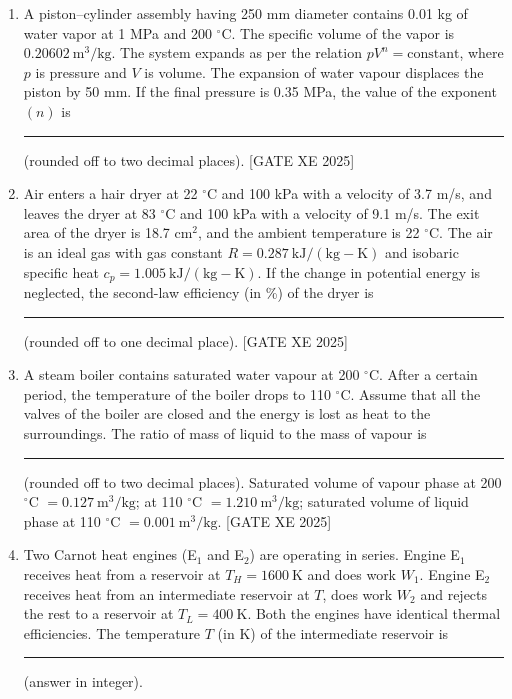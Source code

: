 \documentclass[journal,12pt,onecolumn]{IEEEtran}
\theoremstyle{remark}
\begin{document}
\begin{enumerate}
\item A piston–cylinder assembly having 250 mm diameter contains 0.01 kg of water vapor at 1 MPa and 200 $^\circ$C. The specific volume of the vapor is $0.20602\ \mathrm{m^3/kg}$. The system expands as per the relation $pV^n=\text{constant}$, where $p$ is pressure and $V$ is volume. The expansion of water vapour displaces the piston by 50 mm. If the final pressure is 0.35 MPa, the value of the exponent $(n)$ is \rule{3cm}{0.15mm} (rounded off to two decimal places).
\hfill[GATE XE 2025]

\item Air enters a hair dryer at 22 $^\circ$C and 100 kPa with a velocity of 3.7 m/s, and leaves the dryer at 83 $^\circ$C and 100 kPa with a velocity of 9.1 m/s. The exit area of the dryer is 18.7 cm$^2$, and the ambient temperature is 22 $^\circ$C. The air is an ideal gas with gas constant $R=0.287\ \mathrm{kJ/(kg\!-\!K)}$ and isobaric specific heat $c_p=1.005\ \mathrm{kJ/(kg\!-\!K)}$. If the change in potential energy is neglected, the second-law efficiency (in \%) of the dryer is \rule{3cm}{0.15mm} (rounded off to one decimal place).
\hfill[GATE XE 2025]

\item A steam boiler contains saturated water vapour at 200 $^\circ$C. After a certain period, the temperature of the boiler drops to 110 $^\circ$C. Assume that all the valves of the boiler are closed and the energy is lost as heat to the surroundings. The ratio of mass of liquid to the mass of vapour is \rule{3cm}{0.15mm} (rounded off to two decimal places). Saturated volume of vapour phase at 200 $^\circ$C $=0.127\ \mathrm{m^3/kg}$; at 110 $^\circ$C $=1.210\ \mathrm{m^3/kg}$; saturated volume of liquid phase at 110 $^\circ$C $=0.001\ \mathrm{m^3/kg}$.
\hfill[GATE XE 2025]

\item Two Carnot heat engines (E$_1$ and E$_2$) are operating in series. Engine E$_1$ receives heat from a reservoir at $T_H=1600\ \mathrm{K}$ and does work $W_1$. Engine E$_2$ receives heat from an intermediate reservoir at $T$, does work $W_2$ and rejects the rest to a reservoir at $T_L=400\ \mathrm{K}$. Both the engines have identical thermal efficiencies. The temperature $T$ (in K) of the intermediate reservoir is \rule{3cm}{0.15mm} (answer in integer).


\end{enumerate}
\end{document}
